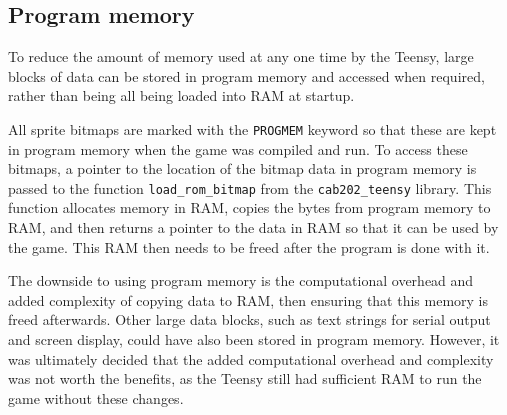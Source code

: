 \documentclass[10pt, titlepage]{article}
\begin{document}
\subsection{Program memory}
To reduce the amount of memory used at any one time by the Teensy, large blocks of data can be stored in program memory and accessed when required, rather than being all being loaded into RAM at startup.

All sprite bitmaps are marked with the \texttt{PROGMEM} keyword so that these are kept in program memory when the game was compiled and run. To access these bitmaps, a pointer to the location of the bitmap data in program memory is passed to the function \texttt{load\_rom\_bitmap} from the \texttt{cab202\_teensy} library. This function allocates memory in RAM, copies the bytes from program memory to RAM, and then returns a pointer to the data in RAM so that it can be used by the game. This RAM then needs to be freed after the program is done with it.

The downside to using program memory is the computational overhead and added complexity of copying data to RAM, then ensuring that this memory is freed afterwards. Other large data blocks, such as text strings for serial output and screen display, could have also been stored in program memory. However, it was ultimately decided that the added computational overhead and complexity was not worth the benefits, as the Teensy still had sufficient RAM to run the game without these changes.
\end{document}
